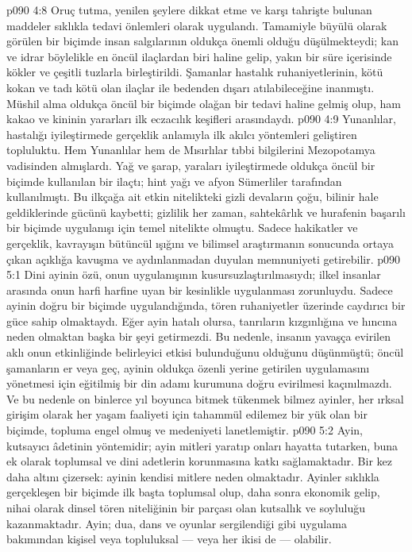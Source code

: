\vs p090 4:8 Oruç tutma, yenilen şeylere dikkat etme ve karşı tahrişte bulunan maddeler sıklıkla tedavi önlemleri olarak uygulandı. Tamamiyle büyülü olarak görülen bir biçimde insan salgılarının oldukça önemli olduğu düşülmekteydi; kan ve idrar böylelikle en öncül ilaçlardan biri haline gelip, yakın bir süre içerisinde kökler ve çeşitli tuzlarla birleştirildi. Şamanlar hastalık ruhaniyetlerinin, kötü kokan ve tadı kötü olan ilaçlar ile bedenden dışarı atılabileceğine inanmıştı. Müshil alma oldukça öncül bir biçimde olağan bir tedavi haline gelmiş olup, ham kakao ve kininin yararları ilk eczacılık keşifleri arasındaydı.
\vs p090 4:9 Yunanlılar, hastalığı iyileştirmede gerçeklik anlamıyla ilk akılcı yöntemleri geliştiren topluluktu. Hem Yunanlılar hem de Mısırlılar tıbbi bilgilerini Mezopotamya vadisinden almışlardı. Yağ ve şarap, yaraları iyileştirmede oldukça öncül bir biçimde kullanılan bir ilaçtı; hint yağı ve afyon Sümerliler tarafından kullanılmıştı. Bu ilkçağa ait etkin nitelikteki gizli devaların çoğu, bilinir hale geldiklerinde gücünü kaybetti; gizlilik her zaman, sahtekârlık ve hurafenin başarılı bir biçimde uygulanışı için temel nitelikte olmuştu. Sadece hakikatler ve gerçeklik, kavrayışın bütüncül ışığını ve bilimsel araştırmanın sonucunda ortaya çıkan açıklığa kavuşma ve aydınlanmadan duyulan memnuniyeti getirebilir.
\vs p090 5:1 Dini ayinin özü, onun uygulanışının kusursuzlaştırılmasıydı; ilkel insanlar arasında onun harfi harfine uyan bir kesinlikle uygulanması zorunluydu. Sadece ayinin doğru bir biçimde uygulandığında, tören ruhaniyetler üzerinde caydırıcı bir güce sahip olmaktaydı. Eğer ayin hatalı olursa, tanrıların kızgınlığına ve hıncına neden olmaktan başka bir şeyi getirmezdi. Bu nedenle, insanın yavaşça evirilen aklı  onun etkinliğinde belirleyici etkisi bulunduğunu olduğunu düşünmüştü; öncül şamanların er veya geç, ayinin oldukça özenli yerine getirilen uygulamasını yönetmesi için eğitilmiş bir din adamı kurumuna doğru evirilmesi kaçınılmazdı. Ve bu nedenle on binlerce yıl boyunca bitmek tükenmek bilmez ayinler, her ırksal girişim olarak her yaşam faaliyeti için tahammül edilemez bir yük olan bir biçimde, topluma engel olmuş ve medeniyeti lanetlemiştir.
\vs p090 5:2 Ayin, kutsayıcı âdetinin yöntemidir; ayin mitleri yaratıp onları hayatta tutarken, buna ek olarak toplumsal ve dini adetlerin korunmasına katkı sağlamaktadır. Bir kez daha altını çizersek: ayinin kendisi mitlere neden olmaktadır. Ayinler sıklıkla gerçekleşen bir biçimde ilk başta toplumsal olup, daha sonra ekonomik gelip, nihai olarak dinsel tören niteliğinin bir parçası olan kutsallık ve soyluluğu kazanmaktadır. Ayin; dua, dans ve oyunlar sergilendiği gibi uygulama bakımından kişisel veya topluluksal --- veya her ikisi de --- olabilir.
